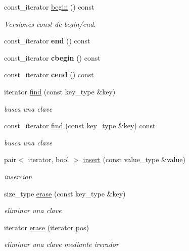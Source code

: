 \begin{DoxyCompactItemize}
\item 
\hypertarget{classstring__map_a216315c88b9f5543ecb8757bfd52e1ff}{const\-\_\-iterator \hyperlink{classstring__map_a216315c88b9f5543ecb8757bfd52e1ff}{begin} () const }\label{classstring__map_a216315c88b9f5543ecb8757bfd52e1ff}

\begin{DoxyCompactList}\small\item\em Versiones const de begin/end. \end{DoxyCompactList}\item 
\hypertarget{classstring__map_ab7c30fe3d5f617bd9a382be245b0ff51}{const\-\_\-iterator {\bfseries end} () const }\label{classstring__map_ab7c30fe3d5f617bd9a382be245b0ff51}

\item 
\hypertarget{classstring__map_a1c94fa132a30ad8057620c35de148057}{const\-\_\-iterator {\bfseries cbegin} () const }\label{classstring__map_a1c94fa132a30ad8057620c35de148057}

\item 
\hypertarget{classstring__map_a2128cba664aa87df409a6f1a2070f76c}{const\-\_\-iterator {\bfseries cend} () const }\label{classstring__map_a2128cba664aa87df409a6f1a2070f76c}

\item 
iterator \hyperlink{classstring__map_a26ebaabee4519ef37957794de8b28c00}{find} (const key\-\_\-type \&key)
\begin{DoxyCompactList}\small\item\em busca una clave \end{DoxyCompactList}\item 
const\-\_\-iterator \hyperlink{classstring__map_afe84b9fde5e50f891cf258bb359a8930}{find} (const key\-\_\-type \&key) const 
\begin{DoxyCompactList}\small\item\em busca una clave \end{DoxyCompactList}\item 
pair$<$ iterator, bool $>$ \hyperlink{classstring__map_a9610289dca67fb2b02fb0880b2a4c48e}{insert} (const value\-\_\-type \&value)
\begin{DoxyCompactList}\small\item\em insercion \end{DoxyCompactList}\item 
size\-\_\-type \hyperlink{classstring__map_a380bf45fbfd19efcda1f9579e5c8600c}{erase} (const key\-\_\-type \&key)
\begin{DoxyCompactList}\small\item\em eliminar una clave \end{DoxyCompactList}\item 
iterator \hyperlink{classstring__map_ad60e0ff5d5980940ef299cd45482a4e7}{erase} (iterator pos)
\begin{DoxyCompactList}\small\item\em eliminar una clave mediante irerador \end{DoxyCompactList}\end{DoxyCompactItemize}


